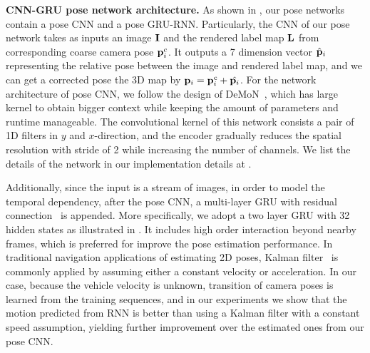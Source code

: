 \textbf{CNN-GRU pose network architecture.}
As shown in , our pose networks contain a pose CNN and a pose GRU-RNN. Particularly,
the CNN of our pose network takes as inputs an image ${\mathbf I}$ and the rendered label map ${\mathbf L}$ from corresponding coarse camera pose ${\mathbf p}_i^c$. It outputs a 7 dimension vector $\hat{{\mathbf p}}_i$ representing the relative pose between the image and rendered label map, and we can get a corrected pose \wrt the 3D map by ${\mathbf p}_i = {\mathbf p}_i^c + \hat{{\mathbf p}_i}$.
For the network architecture of pose CNN, we follow the design of DeMoN~\cite{ummenhofer2016demon}, which has large kernel to obtain bigger context while keeping the amount of parameters and runtime manageable. The convolutional kernel of this network consists a pair of 1D filters in $y$ and $x$-direction, and the encoder gradually reduces the spatial resolution with stride of 2 while increasing the number of channels. We list the details of the network in our implementation details at .

Additionally, since the input is a stream of images, in order to model the temporal dependency,
after the pose CNN, a multi-layer GRU with residual connection~\cite{wu2016google} is appended.
More specifically, we adopt a two layer GRU with 32 hidden states as illustrated in . It includes high order interaction beyond nearby frames, which is preferred for improve the pose estimation performance.
In traditional navigation applications of estimating 2D poses,  Kalman filter~\cite{kalman1960new} is commonly applied by assuming either a constant velocity or acceleration.
In our case, because the vehicle velocity is unknown, transition of camera poses is learned from the training sequences, and in our experiments we show that the motion predicted from RNN is better than using a Kalman filter with a constant speed assumption, yielding further improvement over the estimated ones from our pose CNN.

